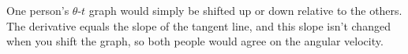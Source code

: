 One person's $\theta$-$t$ graph would simply be shifted up or
down relative to the others. The derivative equals the slope of the tangent line,
and this slope isn't changed when you shift the graph, so both people would agree
on the angular velocity.



